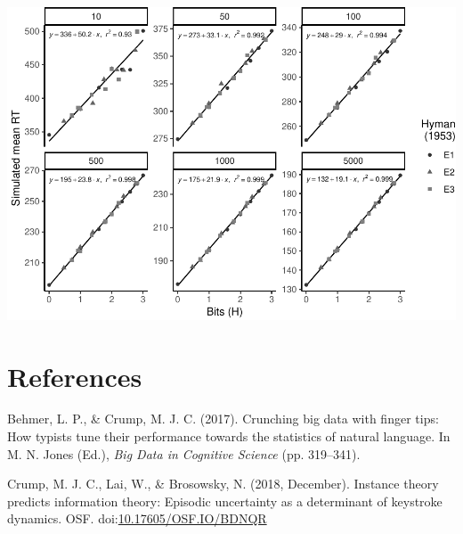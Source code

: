 \documentclass[,man,floatsintext]{apa6}
\begin{document}
\includegraphics{Supplemental_materials_files/figure-latex/unnamed-chunk-1-1.pdf}

\hypertarget{references}{%
\section{References}\label{references}}

\begingroup
\setlength{\parindent}{-0.5in}
\setlength{\leftskip}{0.5in}

\hypertarget{refs}{}
\leavevmode\hypertarget{ref-behmer_crunching_2017}{}%
Behmer, L. P., \& Crump, M. J. C. (2017). Crunching big data with finger tips: How typists tune their performance towards the statistics of natural language. In M. N. Jones (Ed.), \emph{Big Data in Cognitive Science} (pp. 319--341).

\leavevmode\hypertarget{ref-Crump_Lai_Brosowsky_2018}{}%
Crump, M. J. C., Lai, W., \& Brosowsky, N. (2018, December). Instance theory predicts information theory: Episodic uncertainty as a determinant of keystroke dynamics. OSF. doi:\href{https://doi.org/10.17605/OSF.IO/BDNQR}{10.17605/OSF.IO/BDNQR}

\endgroup
\end{document}
